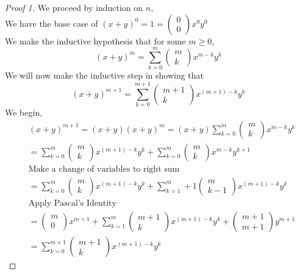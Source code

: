 \documentclass[11pt]{article}
\theoremstyle{definition}
\begin{document}
\begin{proof}[Proof 1]
We proceed by induction on $n$,\\
We have the base case of $(x+y)^0 = 1 = \begin{pmatrix} 0 \\ 0 \end{pmatrix}x^0y^0$\\
We make the inductive hypothesis that for some $m \geq 0$,\\ 
\begin{equation*}
(x+y)^m = \sum_{k=0}^m \begin{pmatrix} m \\ k \end{pmatrix}x^{m-k}y^k
\end{equation*}
We will now make the inductive step in showing that 
\begin{equation*}
    (x+y)^{m+1} = \sum_{k=0}^{m+1} \begin{pmatrix} m+1 \\ k \end{pmatrix}x^{(m+1)-k}y^k
\end{equation*}
We begin,
\begin{align*}
    &(x+y)^{m+1}=(x+y)(x+y)^m
    =(x+y)\sum_{k=0}^m \begin{pmatrix}m\\k\end{pmatrix} x^{m-k}y^k\\
    &=\sum_{k=0}^m  \begin{pmatrix}m\\k\end{pmatrix} x^{(m+1)-k}y^k
    +\sum_{k=0}^m \begin{pmatrix}m\\k\end{pmatrix} x^{m-k}y^{k+1}\\
    &\text{Make a change of variables to right sum}\\
    &=\sum_{k=0}^m  \begin{pmatrix}m\\k\end{pmatrix} x^{(m+1)-k}y^k
    +\sum_{k=1}^m+1 \begin{pmatrix}m\\k-1\end{pmatrix} x^{(m+1)-k}y^{k}\\
    &\text{Apply Pascal's Identity}\\
    &=\begin{pmatrix}m\\0\end{pmatrix}x^{m+1}
    +\sum_{k=1}^m \begin{pmatrix} m+1\\k \end{pmatrix}x^{(m+1)-k}y^k
    +\begin{pmatrix}m+1\\m+1\end{pmatrix}y^{m+1}\\
    &=\sum_{k=0}^{m+1} \begin{pmatrix} m+1\\k \end{pmatrix} x^{(m+1)-k} y^k
\end{align*}



\end{proof}
\end{document}
